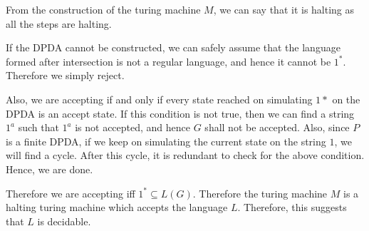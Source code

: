 \documentclass{article}
\begin{document}
\begin{question}
	From the construction of the turing machine $M$, we can say that it is halting as all the steps are halting. \br%
	
	If the DPDA cannot be constructed, we can safely assume that the language formed after intersection is not a regular language, and hence it cannot be $1^\ast$. Therefore we simply reject. \br%

	Also, we are accepting if and only if every state reached on simulating $1*$ on the DPDA is an accept state. If this condition is not true, then we can find a string $1^a$ such that $1^a$ is not accepted, and hence $G$ shall not be accepted. Also, since $P$ is a finite DPDA, if we keep on simulating the current state on the string $1$, we will find a cycle. After this cycle, it is redundant to check for the above condition. Hence, we are done. \br%
	
	Therefore we are accepting iff $1^* \subseteq L(G)$. Therefore the turing machine $M$ is a halting turing machine which accepts the language $L$. Therefore, this suggests that $L$ is decidable.
	
\end{question}
\end{document}
